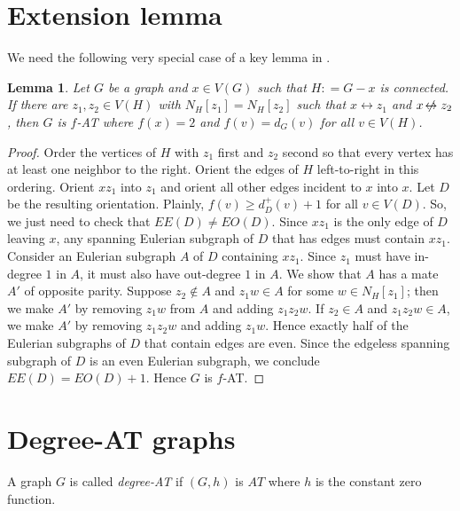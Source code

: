 \documentclass[12pt]{article}
\theoremstyle{plain}
\newtheorem{lem}[thm]{Lemma}
\theoremstyle{definition}
\theoremstyle{remark}
\newcommand{\DefinedAs}{\mathrel{\mathop:}=}
\def\adj{\leftrightarrow}
\def\nonadj{\not\!\leftrightarrow}
\def\adj{\leftrightarrow}
\begin{document}
\section{Extension lemma}
We need the following very special case of a key lemma in \cite{OreVizing}.

\begin{lem}\label{GeneralEulerLemma}
	Let $G$ be a graph and $x \in V(G)$ such that $H \DefinedAs G-x$ is connected.  If there are $z_1, z_2 \in V(H)$ with $N_H[z_1] = N_H[z_2]$ such that $x \adj z_1$ and $x \nonadj z_2$, 
	then $G$ is $f$-AT where $f(x) = 2$ and $f(v) = d_G(v)$ for all $v \in V(H)$.
\end{lem}
\begin{proof}
	Order the vertices of $H$ with $z_1$ first and $z_2$ second so that every vertex has at least one neighbor to the right. Orient the edges of $H$ left-to-right in this ordering.  
	Orient $xz_1$ into $z_1$ and orient all other edges incident to $x$ into $x$.  Let $D$ be the resulting orientation.  Plainly, $f(v) \ge d_{D}^+(v) + 1$ for all $v \in V(D)$.  So, we just need to check that
	$EE(D) \ne EO(D)$.  Since $xz_1$ is the only edge of $D$ leaving $x$, any spanning Eulerian subgraph of $D$ that has edges must contain $xz_1$.   Consider an Eulerian subgraph $A$ of $D$ containing $xz_1$. Since $z_1$ must have in-degree $1$ in $A$, it must also have out-degree $1$ in $A$.  We show that $A$ has a mate $A'$ of opposite parity.  Suppose $z_2 \not \in A$ and $z_1w \in A$ for some $w \in N_H[z_1]$; then we make $A'$ by removing $z_1w$ from $A$ and adding $z_1z_2w$.  If $z_2 \in A$ and $z_1z_2w \in A$, we make $A'$ by removing $z_1z_2w$ and adding $z_1w$. Hence exactly half of the Eulerian subgraphs of $D$ that contain edges are even.  Since the edgeless spanning subgraph of $D$ is an even Eulerian subgraph, we conclude $EE(D) = EO(D) + 1$.  Hence $G$ is $f$-AT.
\end{proof}

\section{Degree-AT graphs}
A graph $G$ is called \emph{degree-AT} if $(G,h)$ is $AT$ where $h$ is the constant zero function.
\end{document}
